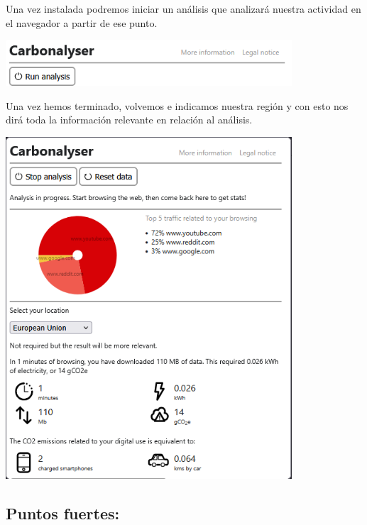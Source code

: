 \documentclass[12pt,a4paper]{report}
\begin{document}
Una vez instalada podremos iniciar un análisis que analizará nuestra actividad
en el navegador a partir de ese punto.

\begin{center}
  \includegraphics[width=0.8\textwidth]{imagenes/Carbonalyser_2.png}
\end{center}

Una vez hemos terminado, volvemos e indicamos nuestra región y con esto nos
dirá toda la información relevante en relación al análisis.

\begin{center}
  \includegraphics[width=0.8\textwidth]{imagenes/Carbonalyser_3.png}
\end{center}

\subsection*{Puntos fuertes:}
\end{document}
